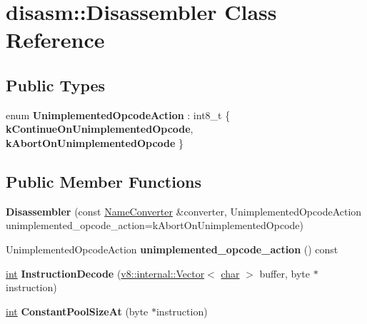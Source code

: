 \hypertarget{classdisasm_1_1Disassembler}{}\section{disasm\+:\+:Disassembler Class Reference}
\label{classdisasm_1_1Disassembler}
\subsection*{Public Types}
\begin{DoxyCompactItemize}
\item 
\mbox{\label{classdisasm_1_1Disassembler_a9b5e1a9549f5088ee4893a903ac44436}} 
enum {\bfseries Unimplemented\+Opcode\+Action} \+: int8\+\_\+t \{ {\bfseries k\+Continue\+On\+Unimplemented\+Opcode}, 
{\bfseries k\+Abort\+On\+Unimplemented\+Opcode}
 \}
\end{DoxyCompactItemize}
\subsection*{Public Member Functions}
\begin{DoxyCompactItemize}
\item 
\mbox{\label{classdisasm_1_1Disassembler_aca324f01ef8d203210ca909bec93a5ea}} 
{\bfseries Disassembler} (const \mbox{\hyperlink{classdisasm_1_1NameConverter}{Name\+Converter}} \&converter, Unimplemented\+Opcode\+Action unimplemented\+\_\+opcode\+\_\+action=k\+Abort\+On\+Unimplemented\+Opcode)
\item 
\mbox{\label{classdisasm_1_1Disassembler_acbb7e8edf6caf55cbe105832f9ae88ea}} 
Unimplemented\+Opcode\+Action {\bfseries unimplemented\+\_\+opcode\+\_\+action} () const
\item 
\mbox{\label{classdisasm_1_1Disassembler_ad9cd04c72d0e03d72f0620a67dc95b8f}} 
\mbox{\hyperlink{classint}{int}} {\bfseries Instruction\+Decode} (\mbox{\hyperlink{classv8_1_1internal_1_1Vector}{v8\+::internal\+::\+Vector}}$<$ \mbox{\hyperlink{classchar}{char}} $>$ buffer, byte $\ast$instruction)
\item 
\mbox{\label{classdisasm_1_1Disassembler_afb85ab5c4d646b7a1aeea00797c05b30}} 
\mbox{\hyperlink{classint}{int}} {\bfseries Constant\+Pool\+Size\+At} (byte $\ast$instruction)
\end{DoxyCompactItemize}
